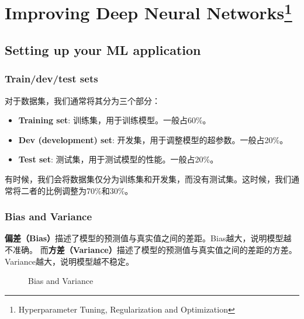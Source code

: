 \chapter[Improving Deep Neural Networks]{Improving Deep Neural Networks\setcounter{footnote}{0}\footnote{Hyperparameter Tuning, Regularization and Optimization}}

\section{Setting up your ML application}

\subsection{Train/dev/test sets}
对于数据集，我们通常将其分为三个部分：
\begin{itemize}
    \item \textbf{Training set}: 训练集，用于训练模型。一般占60\%。
    \item \textbf{Dev (development) set}: 开发集，用于调整模型的超参数。一般占20\%。
    \item \textbf{Test set}: 测试集，用于测试模型的性能。一般占20\%。
\end{itemize}
有时候，我们会将数据集仅分为训练集和开发集，而没有测试集。这时候，我们通常将二者的比例调整为70\%和30\%。

\subsection{Bias and Variance}
\textbf{偏差（Bias）}描述了模型的预测值与真实值之间的差距。Bias越大，说明模型越不准确。
而\textbf{方差（Variance）}描述了模型的预测值与真实值之间的差距的方差。Variance越大，说明模型越不稳定。

\begin{figure*}[h!bt]
    \centering
    \centering
    \caption{Bias and Variance}
    \label{fig:bias-variance}
\end{figure*}

